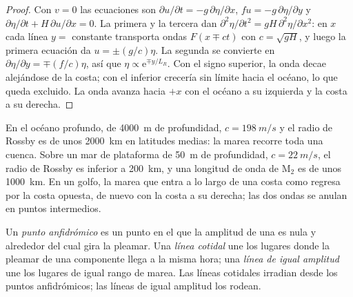 \begin{proof}
Con $v = 0$ las ecuaciones son $\partial u/\partial t = -g\,\partial\eta/
\partial x$, $fu = -g\,\partial\eta/\partial y$ y $\partial\eta/\partial t
+ H\,\partial u/\partial x = 0$. La primera y la tercera dan $\partial^2
\eta/\partial t^2 = gH\,\partial^2\eta/\partial x^2$: en $x$ cada línea
$y = $ constante transporta ondas $F(x \mp ct)$ con $c = \sqrt{gH}$, y luego la
primera ecuación da $u = \pm(g/c)\eta$. La segunda se convierte en $\partial\eta/
\partial y = \mp(f/c)\eta$, así que $\eta \propto \mathrm e^{\mp y/L_R}$. Con
el signo superior, la onda decae alejándose de la costa; con el inferior
crecería sin límite hacia el océano, lo que queda excluido. La onda avanza
hacia $+x$ con el océano a su izquierda y la costa a su derecha.
\end{proof}

En el océano profundo, de \qty{4000}{m} de profundidad, $c = \qty{198}{m/s}$ y el
radio de Rossby es de unos \qty{2000}{km} en latitudes medias: la marea recorre
toda una cuenca. Sobre un mar de plataforma de \qty{50}{m} de profundidad, $c =
\qty{22}{m/s}$, el radio de Rossby es inferior a \qty{200}{km}, y una longitud de onda de M$_2$
es de unos \qty{1000}{km}. En un golfo, la marea que entra a lo largo de una
costa como  regresa por la costa opuesta, de nuevo con la
costa a su derecha; las dos ondas se anulan en puntos intermedios.

\begin{definition}\label{def:b3:ocean-dynamics:amphidrome}
Un \emph{punto anfidrómico} es un punto en el que la
amplitud de una  es nula y alrededor del cual
gira la pleamar. Una \emph{línea cotidal} une los lugares donde
la pleamar de una componente llega a la misma hora; una \emph{línea de
igual amplitud} une los lugares de igual rango de marea. Las
líneas cotidales irradian desde los puntos anfidrómicos; las líneas de igual amplitud los rodean.
\end{definition}

